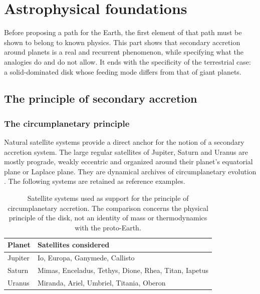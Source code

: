 \documentclass[11pt,a4paper,openany]{report}
\begin{document}
\part{Astrophysical foundations}
\label{part:fondements}

\noindent
Before proposing a path for the Earth, the first element of that path must be shown to belong to
known physics. This part shows that secondary accretion around planets is a real and recurrent
phenomenon, while specifying what the analogies do and do not allow. It ends with the specificity
of the terrestrial case: a solid-dominated disk whose feeding mode differs from that of giant
planets.

\chapter{The principle of secondary accretion}
\label{ch:accretion-secondaire}\label{sec:satellites}

\section{The circumplanetary principle}

Natural satellite systems provide a direct anchor for the notion of a secondary accretion system.
The large regular satellites of Jupiter, Saturn and Uranus are mostly prograde, weakly eccentric
and organized around their planet's equatorial plane or Laplace plane. They are dynamical archives
of circumplanetary evolution \cite{Nimmo2026,Blanc2025,JPL}. The following systems are retained as
reference examples.

\begin{table}[htbp]
\centering
\caption{Satellite systems used as support for the principle of circumplanetary accretion. The
comparison concerns the physical principle of the disk, not an identity of mass or thermodynamics
with the proto-Earth.}
\label{tab:systemes}
\begin{tabular}{ll}
\toprule
\textbf{Planet} & \textbf{Satellites considered} \\
\midrule
Jupiter & Io, Europa, Ganymede, Callisto \\
Saturn & Mimas, Enceladus, Tethys, Dione, Rhea, Titan, Iapetus \\
Uranus  & Miranda, Ariel, Umbriel, Titania, Oberon \\
\bottomrule
\end{tabular}
\end{table}
\end{document}

